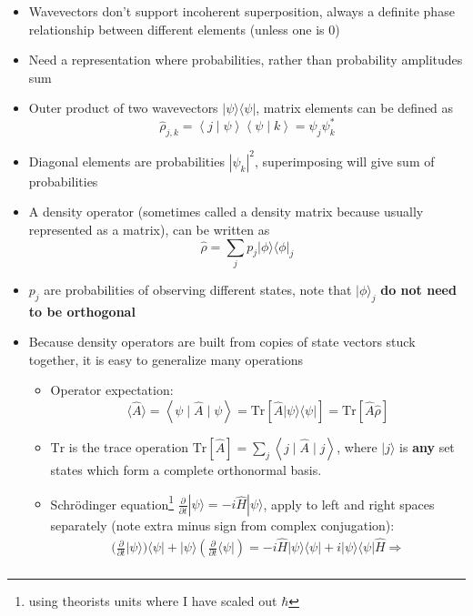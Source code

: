 \documentclass[english]{article}
\newcommand{\bra}[1]{\langle#1 |}
\newcommand{\ket}[1]{|#1 \rangle}
\newcommand{\braket}[2]{\left \langle #1 \mid #2 \right \rangle}
\newcommand{\ketbra}[2]{\vert #1 \rangle \! \langle #2 \vert}
\newcommand{\average}[1]{\langle #1 \rangle}
\newcommand{\sandwich}[3]{\left \langle #1 \mid #2 \mid #3 \right\rangle}
\begin{document}
\begin{itemize}
\item Wavevectors don't support incoherent superposition, always a definite phase relationship between different elements (unless one is $0$)
\item Need a representation where probabilities, rather than probability amplitudes sum
\item Outer product of two wavevectors $\ketbra{\psi}{\psi}$, matrix elements can be defined as 
\begin{equation}
\hat{\rho}_{j,k}=\braket{j}{\psi}\braket{\psi}{k}=\psi_j\psi^*_k
\end{equation}
\item Diagonal elements are probabilities $|\psi_k|^2$, superimposing will give sum of probabilities
\item A density operator (sometimes called a density matrix because usually represented as a matrix), can be written as 
\begin{equation}
\hat{\rho}=\sum_j p_j\ketbra{\phi}{\phi}_j
\end{equation}
\item $p_j$ are probabilities of observing different states, note that $\ket{\phi}_j$ \textbf{do not need to be orthogonal}
\item Because density operators are built from copies of state vectors stuck together, it is easy to generalize many operations
\begin{itemize}
\item Operator expectation:
\begin{equation}
\average{\hat{A}}=\sandwich{\psi}{\hat{A}}{\psi}=\mathrm{Tr}[\hat{A}\ketbra{\psi}{\psi}]=\mathrm{Tr}[\hat{A}\hat{\rho}]
\end{equation}
\item $\mathrm{Tr}$ is the trace operation $\mathrm{Tr}[\hat{A}]=\sum_j\sandwich{j}{\hat{A}}{j}$, where $\ket{j}$ is \textbf{any} set states which form a complete orthonormal basis.
\item Schr{\"o}dinger equation\footnote{using theorists units where I have scaled out $\hbar$} $\frac{\partial}{\partial t}\ket{\psi}=-i\hat{H}\ket{\psi}$, apply to left and right spaces separately (note extra minus sign from complex conjugation):
\begin{align}
(\frac{\partial}{\partial t}\ket{\psi})\bra{\psi}+\ket{\psi}(\frac{\partial}{\partial t}\bra{\psi})=-i\hat{H}\ketbra{\psi}{\psi}+i\ketbra{\psi}{\psi}\hat{H} \Rightarrow \\

\end{align}
\end{itemize}
\end{itemize}
\end{document}
